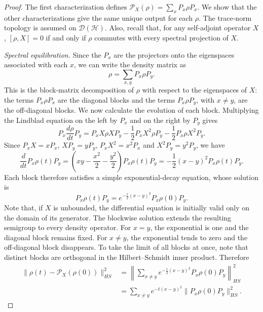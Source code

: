 \documentclass{techbrief}
\begin{document}
\begin{proof}
	The first characterization defines $\mathcal{P}_X(\rho)=\sum_xP_x\rho P_x$. We show that the other characterizations give the same unique output for each $\rho$. The trace-norm topology is assumed on $\mathcal{D}(\mathcal{H})$. Also, recall that, for any self-adjoint operator $X$, $[\rho,X]=0$ if and only if $\rho$ commutes with every spectral projection of $X$.

	\emph{Spectral equilibration.} Since the $P_x$ are the projectors onto the eigenspaces associated with each $x$, we can write the density matrix as
	\begin{equation}
		\rho=\sum_{x,y}P_x\rho P_y.
	\end{equation}
	This is the block-matrix decomposition of $\rho$ with respect to the eigenspaces of $X$: the terms $P_x\rho P_x$ are the diagonal blocks and the terms $P_x\rho P_y$, with $x\neq y$, are the off-diagonal blocks. We now calculate the evolution of each block. Multiplying the Lindblad equation on the left by $P_x$ and on the right by $P_y$ gives
	\begin{equation}
		P_x\frac{d\rho}{dt}P_y=P_xX\rho XP_y-\frac{1}{2}P_xX^2\rho P_y-\frac{1}{2}P_x\rho X^2P_y.
	\end{equation}
	Since $P_xX=xP_x$, $XP_y=yP_y$, $P_xX^2=x^2P_x$ and $X^2P_y=y^2P_y$, we have
	\begin{equation}
		\frac{d}{dt}P_x\rho(t)P_y=\left(xy-\frac{x^2}{2}-\frac{y^2}{2}\right)P_x\rho(t)P_y=-\frac{1}{2}(x-y)^2P_x\rho(t)P_y.
	\end{equation}
	Each block therefore satisfies a simple exponential-decay equation, whose solution is
	\begin{equation}
		P_x\rho(t)P_y=e^{-\frac{t}{2}(x-y)^2}P_x\rho(0)P_y.
	\end{equation}
	Note that, if $X$ is unbounded, the differential equation is initially valid only on the domain of its generator. The blockwise solution extends the resulting semigroup to every density operator. For $x=y$, the exponential is one and the diagonal block remains fixed. For $x\neq y$, the exponential tends to zero and the off-diagonal block disappears. To take the limit of all blocks at once, note that distinct blocks are orthogonal in the Hilbert--Schmidt inner product. Therefore
	\begin{align}
		\|\rho(t)-\mathcal{P}_X(\rho(0))\|^2_{HS}
		&=\left\|\sum_{x\neq y}e^{-\frac{t}{2}(x-y)^2}P_x\rho(0)P_y\right\|^2_{HS}\\
		&=\sum_{x\neq y}e^{-t(x-y)^2}\|P_x\rho(0)P_y\|^2_{HS}.

\end{align}
\end{proof}
\end{document}
